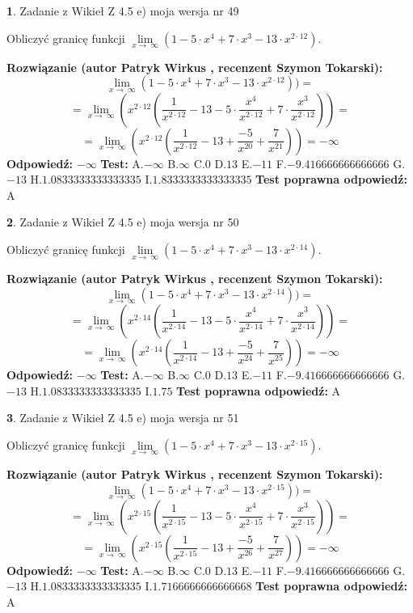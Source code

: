 \documentclass[12pt, a4paper]{article}
\theoremstyle{definition} %
\newtheorem{zad}{}
\newcommand{\zadStart}[1]{\begin{zad}#1\newline}
\newcommand{\zadStop}{\end{zad}}
\newcommand{\rozwStart}[2]{\noindent \textbf{Rozwiązanie (autor #1 , recenzent #2): }\newline}
\newcommand{\rozwStop}{\newline}
\newcommand{\odpStart}{\noindent \textbf{Odpowiedź:}\newline}
\newcommand{\odpStop}{\newline}
\newcommand{\testStart}{\noindent \textbf{Test:}\newline}
\newcommand{\testStop}{\newline}
\newcommand{\kluczStart}{\noindent \textbf{Test poprawna odpowiedź:}\newline}
\newcommand{\kluczStop}{\newline}
\begin{document}
\zadStart{Zadanie z Wikieł Z 4.5 e) moja wersja nr 49}


Obliczyć granicę funkcji  $\lim\limits_{x\to\ \infty}(1 - 5 \cdot x^{4}+7 \cdot x^{3}- 13 \cdot x^{2\cdot12})$.
\zadStop
\rozwStart{Patryk Wirkus}{Szymon Tokarski}
$$\lim\limits_{x\to\ \infty}(1 - 5 \cdot x^{4}+7 \cdot x^{3}- 13 \cdot x^{2\cdot12}))=$$
$$=\lim\limits_{x\to\ \infty}(x^{2\cdot12}(\frac{1}{x^{2\cdot12}}-13 -5 \cdot \frac{x^{4}}{x^{2\cdot12}}+7 \cdot \frac{x^{3}}{x^{2\cdot12}}))=$$
$$=\lim\limits_{x\to\ \infty}(x^{2\cdot12}(\frac{1}{x^{2\cdot12}}-13 + \frac{-5}{x^{20}}+ \frac{7}{x^{21}}))=-\infty$$
\rozwStop
\odpStart
$-\infty$
\odpStop
\testStart
A.$-\infty$ B.$\infty$ C.$0$ D.$13$ E.$-11$
F.$-9.416666666666666$ G.$-13$
H.$1.0833333333333335$
I.$1.8333333333333335$
\testStop
\kluczStart
A
\kluczStop



\zadStart{Zadanie z Wikieł Z 4.5 e) moja wersja nr 50}


Obliczyć granicę funkcji  $\lim\limits_{x\to\ \infty}(1 - 5 \cdot x^{4}+7 \cdot x^{3}- 13 \cdot x^{2\cdot14})$.
\zadStop
\rozwStart{Patryk Wirkus}{Szymon Tokarski}
$$\lim\limits_{x\to\ \infty}(1 - 5 \cdot x^{4}+7 \cdot x^{3}- 13 \cdot x^{2\cdot14}))=$$
$$=\lim\limits_{x\to\ \infty}(x^{2\cdot14}(\frac{1}{x^{2\cdot14}}-13 -5 \cdot \frac{x^{4}}{x^{2\cdot14}}+7 \cdot \frac{x^{3}}{x^{2\cdot14}}))=$$
$$=\lim\limits_{x\to\ \infty}(x^{2\cdot14}(\frac{1}{x^{2\cdot14}}-13 + \frac{-5}{x^{24}}+ \frac{7}{x^{25}}))=-\infty$$
\rozwStop
\odpStart
$-\infty$
\odpStop
\testStart
A.$-\infty$ B.$\infty$ C.$0$ D.$13$ E.$-11$
F.$-9.416666666666666$ G.$-13$
H.$1.0833333333333335$
I.$1.75$
\testStop
\kluczStart
A
\kluczStop



\zadStart{Zadanie z Wikieł Z 4.5 e) moja wersja nr 51}


Obliczyć granicę funkcji  $\lim\limits_{x\to\ \infty}(1 - 5 \cdot x^{4}+7 \cdot x^{3}- 13 \cdot x^{2\cdot15})$.
\zadStop
\rozwStart{Patryk Wirkus}{Szymon Tokarski}
$$\lim\limits_{x\to\ \infty}(1 - 5 \cdot x^{4}+7 \cdot x^{3}- 13 \cdot x^{2\cdot15}))=$$
$$=\lim\limits_{x\to\ \infty}(x^{2\cdot15}(\frac{1}{x^{2\cdot15}}-13 -5 \cdot \frac{x^{4}}{x^{2\cdot15}}+7 \cdot \frac{x^{3}}{x^{2\cdot15}}))=$$
$$=\lim\limits_{x\to\ \infty}(x^{2\cdot15}(\frac{1}{x^{2\cdot15}}-13 + \frac{-5}{x^{26}}+ \frac{7}{x^{27}}))=-\infty$$
\rozwStop
\odpStart
$-\infty$
\odpStop
\testStart
A.$-\infty$ B.$\infty$ C.$0$ D.$13$ E.$-11$
F.$-9.416666666666666$ G.$-13$
H.$1.0833333333333335$
I.$1.7166666666666668$
\testStop
\kluczStart
A
\kluczStop
\end{document}
